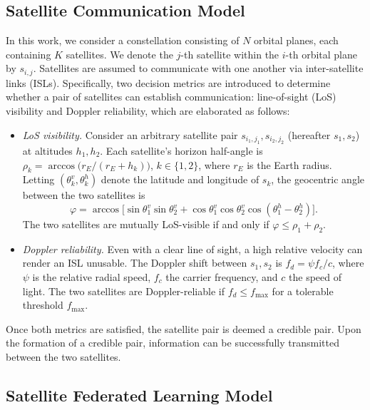 \documentclass[conference]{IEEEtran}
\begin{document}
\subsection{Satellite Communication Model}\label{sec:sysmodel-setup}

In this work, we consider a constellation consisting of $N$ orbital planes, each containing $K$ satellites. We denote the $j$-th satellite within the $i$-th orbital plane by $s_{i,j}$. Satellites are assumed to communicate with one another via inter-satellite links (ISLs). Specifically, two decision metrics are introduced to determine whether a pair of satellites can establish communication: line-of-sight (LoS) visibility and Doppler reliability, which are elaborated as follows:
\begin{itemize}
    \item \emph{LoS visibility.} Consider an arbitrary satellite pair
    $s_{i_1,j_1},s_{i_2,j_2}$ (hereafter $s_1,s_2$) at altitudes
    $h_1,h_2$. Each satellite's horizon half-angle is
    $\rho_k = \arccos\!\bigl(r_E / (r_E + h_k)\bigr)$, $k\in\{1,2\}$,
    where $r_E$ is the Earth radius. Letting
    $(\theta_k^{v},\theta_k^{h})$ denote the latitude and longitude
    of $s_k$, the geocentric angle between the two satellites is
    \begin{equation*}
        \varphi = \arccos\!\bigl[\sin\theta_{1}^{v}\sin\theta_{2}^{v}
        + \cos\theta_{1}^{v}\cos\theta_{2}^{v}\cos(\theta_{1}^{h} - \theta_{2}^{h})\bigr].
    \end{equation*}
    The two satellites are mutually LoS-visible if and only if
    $\varphi \leq \rho_1 + \rho_2$.
\item \emph{Doppler reliability.} Even with a clear line of sight,
    a high relative velocity can render an ISL unusable. The Doppler
    shift between $s_1,s_2$ is $f_d = \psi f_c / c$, where $\psi$ is
    the relative radial speed, $f_c$ the carrier frequency, and $c$
    the speed of light. The two satellites are Doppler-reliable if
    $f_d \leq f_{\max}$ for a tolerable threshold $f_{\max}$.
\end{itemize}

Once both metrics are satisfied, the satellite pair is deemed a credible pair. Upon the formation of a credible pair, information can be successfully transmitted between the two satellites.

\subsection{Satellite Federated Learning Model}
\end{document}
